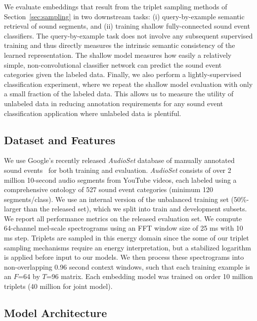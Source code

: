 \documentclass{article}
\begin{document}
We evaluate embeddings that result from the triplet sampling methods of
Section~\ref{sec:sampling} in two downstream tasks: (i) query-by-example
semantic retrieval of sound segments, and (ii) training shallow fully-connected
sound event classifiers.  The query-by-example task does not involve any
subsequent supervised training and thus directly measures the intrinsic semantic
consistency of the learned representation.  The shallow model measures how
easily a relatively simple, non-convolutional classifier network can predict the
sound event categories given the labeled data.  Finally, we also perform a
lightly-supervised classification experiment, where we repeat the shallow model
evaluation with only a small fraction of the labeled data.  This allows us to
measure the utility of unlabeled data in reducing annotation requirements for
any sound event classification application where unlabeled data is plentiful.   

\subsection{Dataset and Features}

We use Google's recently released \emph{AudioSet} database of manually annotated
sound events~\cite{audioset} for both training and evaluation. \emph{AudioSet}
consists of over 2 million 10-second audio segments from YouTube videos, each
labeled using a comprehensive ontology of 527 sound event categories (minimum
120 segments/class). We use an internal version of the unbalanced training set
(50\%-larger than the released set), which we split into train and development
subsets.  We report all performance metrics on the released evaluation set.  We
compute 64-channel mel-scale spectrograms using an FFT window size of 25 ms with
10 ms step.  Triplets are sampled in this energy domain since the some of our
triplet sampling mechanisms require an energy interpretation, but a stabilized
logarithm is applied before input to our models.  We then process these
spectrograms into non-overlapping 0.96 second context windows, such that each
training example is an $F$=64 by $T$=96 matrix. Each embedding model was trained
on order 10 million triplets (40 million for joint model).

\subsection{Model Architecture}
\end{document}

